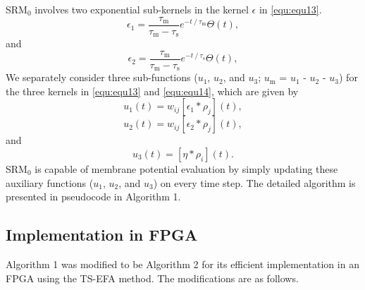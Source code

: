 \documentclass[10pt,journal]{IEEEtran}
\begin{document}
SRM$_\textrm{0}$ involves two exponential sub-kernels in the kernel $\epsilon$ in \eqref{equ:equ13}.
\begin{equation}\label{equ:equ15}
   \epsilon_1 =\frac{\tau_\textrm{m}}{\tau_\textrm{m}-\tau_\textrm{s}} e^{-t\mathbin{/}\tau_\textrm{m}}\Theta(t),
\end{equation}
and 
\begin{equation}\label{equ:equ16}
   \epsilon_2 = \frac{\tau_\textrm{m}}{\tau_\textrm{m}-\tau_\textrm{s}} e^{-t\mathbin{/}\tau_\textrm{s}}\Theta(t),
\end{equation}
We separately consider three sub-functions ($u_\textrm{1}$, $u_\textrm{2}$, and $u_\textrm{3}$; $u_\textrm{m}$ = $u_\textrm{1}$ - $u_\textrm{2}$ - $u_\textrm{3}$) for the three kernels in \eqref{equ:equ13} and \eqref{equ:equ14}, which are given by
\begin{equation}\label{equ:equ17}
    u_1(t)=w_{ij}[\epsilon_1 \ast \rho_j ](t),
\end{equation}
\begin{equation}\label{equ:equ18}
    u_2(t)=w_{ij}[\epsilon_2 \ast \rho_j ](t),
\end{equation}
and
\begin{equation}\label{equ:equ19}
    u_3(t)=[\eta \ast \rho_i](t).
\end{equation}
SRM$_\textrm{0}$ is capable of membrane potential evaluation by simply updating these auxiliary functions ($u_\textrm{1}$, $u_\textrm{2}$, and $u_\textrm{3}$) on every time step. 
The detailed algorithm is presented in pseudocode in Algorithm 1.

\subsection{Implementation in FPGA}
Algorithm 1 was modified to be Algorithm 2 for its efficient implementation in an FPGA using the TS-EFA method. 
The modifications are as follows.
\end{document}
